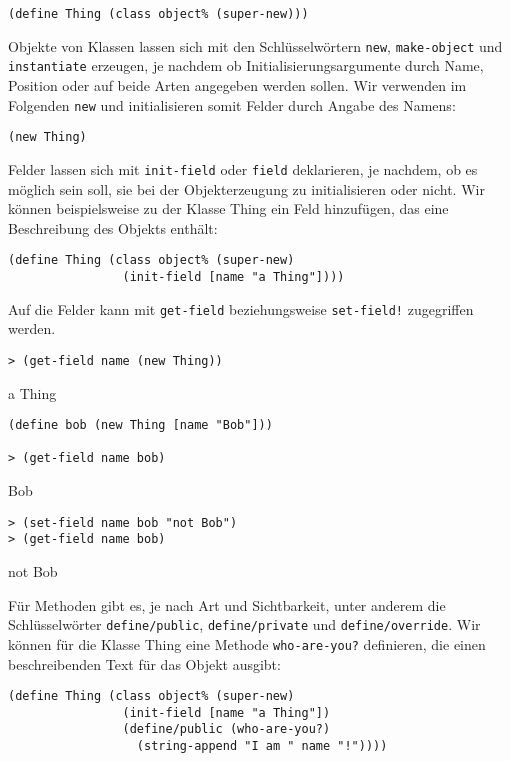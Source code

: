 \begin{lstlisting}
(define Thing (class object% (super-new)))
\end{lstlisting}

Objekte von Klassen lassen sich mit den Schlüsselwörtern \texttt{new}, \texttt{make-object} und \texttt{instantiate} erzeugen, je nachdem ob Initialisierungsargumente durch Name, Position oder auf beide Arten angegeben werden sollen. Wir verwenden im Folgenden \texttt{new} und initialisieren somit Felder durch Angabe des Namens:

\begin{lstlisting}
(new Thing)
\end{lstlisting}

Felder lassen sich mit \texttt{init-field} oder \texttt{field} deklarieren, je nachdem, ob es möglich sein soll, sie bei der Objekterzeugung zu initialisieren oder nicht. Wir können beispielsweise zu der Klasse Thing ein Feld hinzufügen, das eine Beschreibung des Objekts enthält:

\begin{lstlisting}
(define Thing (class object% (super-new)
                (init-field [name "a Thing"])))
\end{lstlisting}

Auf die Felder kann mit \texttt{get-field} beziehungsweise \texttt{set-field!} zugegriffen werden. 

\begin{lstlisting}
> (get-field name (new Thing))
\end{lstlisting}
{\routput {\qq}a Thing{\qq}}

\begin{lstlisting}
(define bob (new Thing [name "Bob"]))

> (get-field name bob)
\end{lstlisting}
{\routput {\qq}Bob{\qq}}

\begin{lstlisting}
> (set-field name bob "not Bob")
> (get-field name bob)
\end{lstlisting}
{\routput {\qq}not Bob{\qq}}

Für Methoden gibt es, je nach Art und Sichtbarkeit, unter anderem die Schlüsselwörter \texttt{define/public}, \texttt{define/private} und \texttt{define/override}. Wir können für die Klasse Thing eine Methode \texttt{who-are-you?} definieren, die einen beschreibenden Text für das Objekt ausgibt:

\begin{lstlisting}
(define Thing (class object% (super-new)
                (init-field [name "a Thing"])
                (define/public (who-are-you?) 
                  (string-append "I am " name "!"))))
\end{lstlisting}

